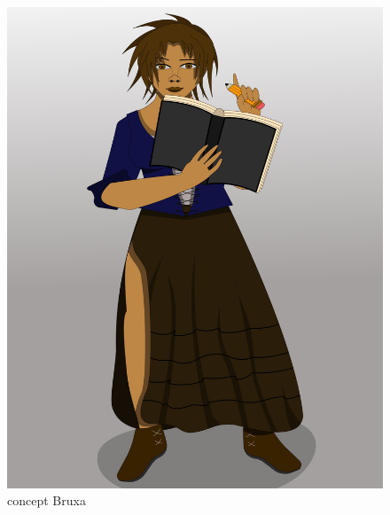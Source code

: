 \begin{figure}[htb]
	\caption{concept Bruxa}
	\begin{center}
	    \includegraphics[width=\textwidth/2]{imagens/capaportifolio.jpeg}
	\end{center}
\end{figure}


\clearpage

